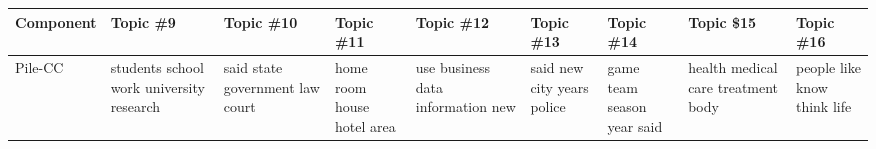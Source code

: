 \documentclass[11pt,a4paper]{article}
\begin{document}
\begin{appendices}
\begin{table*}[htb]
\centering
\vspace{-1.5cm}
\begin{tiny}
\begin{tabular}{|p{}|p{}|p{}|p{}|p{}|p{}|p{}|p{}|p{}|}
\hline
Component & Topic \#9 & Topic \#10 & Topic \#11 & Topic \#12 & Topic \#13 & Topic \#14 & Topic \$15 & Topic \#16\\\hline
Pile-CC & students \newline school \newline work \newline university \newline research & said \newline state \newline government \newline law \newline court & home \newline room \newline house \newline hotel \newline area & use \newline business \newline data \newline information \newline new & said \newline new \newline city \newline years \newline police & game \newline team \newline season \newline year \newline said & health \newline medical \newline care \newline treatment \newline body & people \newline like \newline know \newline think \newline life\\\hline

\end{tabular}
\end{tiny}
\end{table*}
\end{appendices}
\end{document}
